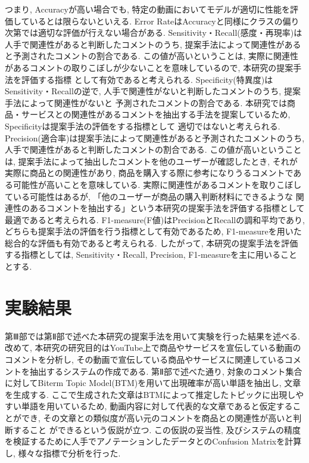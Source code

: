 \documentclass{ltjarticle}
\begin{document}
\newpage
\noindent
つまり, Accuracyが高い場合でも, 特定の動画においてモデルが適切に性能を評価しているとは限らないといえる. 
Error RateはAccuracyと同様にクラスの偏り次第では適切な評価が行えない場合がある. 
Sensitivity・Recall(感度・再現率)は人手で関連性があると判断したコメントのうち, 提案手法によって関連性があると予測されたコメントの割合である. 
この値が高いということは, 実際に関連性があるコメントの取りこぼしが少ないことを意味しているので, 本研究の提案手法を評価する指標
として有効であると考えられる. 
Specificity(特異度)はSensitivity・Recallの逆で, 人手で関連性がないと判断したコメントのうち, 提案手法によって関連性がないと
予測されたコメントの割合である. 
本研究では商品・サービスとの関連性があるコメントを抽出する手法を提案しているため, Specificityは提案手法の評価をする指標として
適切ではないと考えられる. 
Precision(適合率)は提案手法によって関連性があると予測されたコメントのうち, 人手で関連性があると判断したコメントの割合である. 
この値が高いということは, 提案手法によって抽出したコメントを他のユーザーが確認したとき, それが実際に商品との関連性があり, 
商品を購入する際に参考になりうるコメントである可能性が高いことを意味している. 
実際に関連性があるコメントを取りこぼしている可能性はあるが, 「他のユーザーが商品の購入判断材料にできるような
関連性のあるコメントを抽出する」という本研究の提案手法を評価する指標として最適であると考えられる. 
F1-measure(F値)はPrecisionとRecallの調和平均であり, どちらも提案手法の評価を行う指標として有効であるため, 
F1-measureを用いた総合的な評価も有効であると考えられる. したがって, 本研究の提案手法を評価する指標としては, Sensitivity・Recall, 
Precision, F1-measureを主に用いることとする. 

\newpage
\part{実験結果}
第Ⅲ部では第Ⅱ部で述べた本研究の提案手法を用いて実験を行った結果を述べる. 
改めて, 本研究の研究目的はYouTube上で商品やサービスを宣伝している動画のコメントを分析し, 
その動画で宣伝している商品やサービスに関連しているコメントを抽出するシステムの作成である. 
第Ⅱ部で述べた通り, 対象のコメント集合に対してBiterm Topic Model(BTM)を用いて出現確率が高い単語を抽出し,
文章を生成する. 
ここで生成された文章はBTMによって推定したトピックに出現しやすい単語を用いているため, 
動画内容に対して代表的な文章であると仮定することができ, その文章との類似度が高い元のコメントを商品との関連性が高いと判断すること
ができるという仮説が立つ. 
この仮説の妥当性, 及びシステムの精度を検証するために人手でアノテーションしたデータとのConfusion Matrixを計算し, 
様々な指標で分析を行った. 
\end{document}
